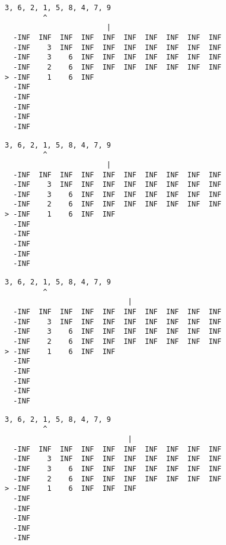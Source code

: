 { \begin{verbatim}
3, 6, 2, 1, 5, 8, 4, 7, 9
         ^
                        |
  -INF  INF  INF  INF  INF  INF  INF  INF  INF  INF
  -INF    3  INF  INF  INF  INF  INF  INF  INF  INF
  -INF    3    6  INF  INF  INF  INF  INF  INF  INF
  -INF    2    6  INF  INF  INF  INF  INF  INF  INF
> -INF    1    6  INF                              
  -INF                                             
  -INF                                             
  -INF                                             
  -INF                                             
  -INF                                             
\end{verbatim} }

{ \begin{verbatim}
3, 6, 2, 1, 5, 8, 4, 7, 9
         ^
                        |
  -INF  INF  INF  INF  INF  INF  INF  INF  INF  INF
  -INF    3  INF  INF  INF  INF  INF  INF  INF  INF
  -INF    3    6  INF  INF  INF  INF  INF  INF  INF
  -INF    2    6  INF  INF  INF  INF  INF  INF  INF
> -INF    1    6  INF  INF                         
  -INF                                             
  -INF                                             
  -INF                                             
  -INF                                             
  -INF                                             
\end{verbatim} }

{ \begin{verbatim}
3, 6, 2, 1, 5, 8, 4, 7, 9
         ^
                             |
  -INF  INF  INF  INF  INF  INF  INF  INF  INF  INF
  -INF    3  INF  INF  INF  INF  INF  INF  INF  INF
  -INF    3    6  INF  INF  INF  INF  INF  INF  INF
  -INF    2    6  INF  INF  INF  INF  INF  INF  INF
> -INF    1    6  INF  INF                         
  -INF                                             
  -INF                                             
  -INF                                             
  -INF                                             
  -INF                                             
\end{verbatim} }

{ \begin{verbatim}
3, 6, 2, 1, 5, 8, 4, 7, 9
         ^
                             |
  -INF  INF  INF  INF  INF  INF  INF  INF  INF  INF
  -INF    3  INF  INF  INF  INF  INF  INF  INF  INF
  -INF    3    6  INF  INF  INF  INF  INF  INF  INF
  -INF    2    6  INF  INF  INF  INF  INF  INF  INF
> -INF    1    6  INF  INF  INF                    
  -INF                                             
  -INF                                             
  -INF                                             
  -INF                                             
  -INF                                             
\end{verbatim} }

